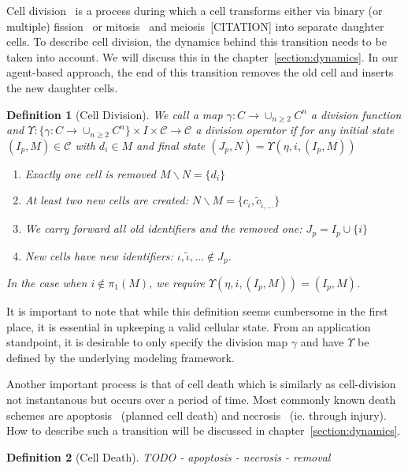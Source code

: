 \documentclass{article}
\newtheorem{definition}{Definition}[section]
\begin{document}
Cell division~\cite{bhlitem268752} is a process during which a cell transforms either via binary
(or multiple) fission~\cite{Biov2014} or mitosis~\cite{Ilowiecki1981,von1835resp} and
meiosis~\cite{}[CITATION] into separate
daughter cells.
To describe cell division, the dynamics behind this transition needs to be taken into account.
We will discuss this in the chapter~\ref{section:dynamics}.
In our agent-based approach, the end of this transition removes the old cell and inserts the new
daughter cells.

\begin{definition}[Cell Division]
    \label{definition:cell-division}
    We call a map $\gamma:C\rightarrow \cup_{n\geq 2}C^n$ a division function and
    $\Upsilon:\{\gamma:C\rightarrow \cup_{n\geq 2}C^n\}\times I\times\mathscr{C}\rightarrow\mathscr{C}$ a 
    division operator if for any initial state $(I_p,M)\in\mathscr{C}$ with $d_i\in M$ and final
    state $(J_p,N)=\Upsilon(\eta,i,(I_p,M))$
    \begin{enumerate}
        \item Exactly one cell is removed $M\backslash N=\{d_i\}$
        \item At least two new cells are created: $N\backslash M=\{c_\iota,\tilde{c}_{\tilde{\iota},\dots}\}$
        \item We carry forward all old identifiers and the removed one: $J_p=I_p\cup\{i\}$
        \item New cells have new identifiers: $\iota,\tilde{\iota},\dots\notin J_p$.
    \end{enumerate}
    In the case when $i\notin\pi_1(M)$, we require $\Upsilon(\eta,i,(I_p,M))=(I_p,M)$.
\end{definition}

It is important to note that while this definition seems cumbersome in the first place, it is
essential in upkeeping a valid cellular state.
From an application standpoint, it is desirable to only specify the division map $\gamma$ and have
$\Upsilon$ be defined by the underlying modeling framework.

Another important process is that of cell death which is similarly as cell-division not instantanous
but occurs over a period of time.
Most commonly known death schemes are apoptosis~\cite{Kerr1965} (planned cell death) and
necrosis~\cite{Gerschenson2001} (ie. through injury).
How to describe such a transition will be discussed in chapter~\ref{section:dynamics}.

\begin{definition}[Cell Death]
    TODO
    - apoptosis
    - necrosis
    - removal
\end{definition}
\end{document}
